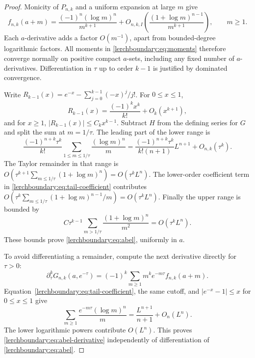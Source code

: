 \documentclass[11pt,a4paper]{article}
\theoremstyle{definition}
\theoremstyle{remark}
\numberwithin{equation}{section}
\begin{document}
\begin{proof}
Monicity of $P_{n,k}$ and a uniform expansion at large $m$ give
\begin{equation}\label{lerchboundary:eq:tail-coefficient}
 f_{n,k}(a+m)
 =\frac{(-1)^n(\log m)^n}{m^{k+1}}
 +O_{n,k,I}\left(\frac{(1+\log m)^{n-1}}{m^{k+1}}\right),
 \qquad m\geq1.
\end{equation}
Each $a$-derivative adds a factor $O(m^{-1})$, apart from bounded-degree
logarithmic factors.  All moments in \eqref{lerchboundary:eq:moments}
therefore converge normally on positive compact $a$-sets, including
any fixed number of $a$-derivatives. Differentiation in $\tau$ up to
order $k-1$ is justified by dominated convergence.

Write
$R_{k-1}(x)=e^{-x}-\sum_{j=0}^{k-1}(-x)^j/j!$. For $0\leq x\leq1$,
\[
 R_{k-1}(x)=\frac{(-1)^k x^k}{k!}+O_k(x^{k+1}),
\]
and for $x\geq1$, $|R_{k-1}(x)|\leq C_k x^{k-1}$.
Subtract $H$ from the defining series for $G$ and split the sum at
$m=1/\tau$. The leading part of the lower range is
\[
 \frac{(-1)^{n+k}\tau^k}{k!}
 \sum_{1\leq m\leq1/\tau}\frac{(\log m)^n}{m}
 =\frac{(-1)^{n+k}\tau^k}{k!(n+1)}L^{n+1}+O_{n,k}(\tau^k).
\]
The Taylor remainder in that range is
$O(\tau^{k+1}\sum_{m\leq1/\tau}(1+\log m)^n)
=O(\tau^k L^n)$.  The lower-order coefficient term in
\eqref{lerchboundary:eq:tail-coefficient} contributes
$O(\tau^k\sum_{m\leq1/\tau}(1+\log m)^{n-1}/m)
=O(\tau^kL^n)$. Finally the upper range is bounded by
\[
 C\tau^{k-1}\sum_{m>1/\tau}\frac{(1+\log m)^n}{m^2}
 =O(\tau^kL^n).
\]
These bounds prove \eqref{lerchboundary:eq:abel}, uniformly in $a$.

To avoid differentiating a remainder, compute the next derivative
directly for $\tau>0$:
\[
 \partial_\tau^kG_{n,k}(a,e^{-\tau})
 =(-1)^k\sum_{m\geq1}m^k e^{-m\tau}f_{n,k}(a+m).
\]
Equation~\eqref{lerchboundary:eq:tail-coefficient}, the same cutoff,
and $|e^{-x}-1|\leq x$ for $0\leq x\leq1$ give
\[
 \sum_{m\geq1}\frac{e^{-m\tau}(\log m)^n}{m}
 =\frac{L^{n+1}}{n+1}+O_n(L^n).
\]
The lower logarithmic powers contribute $O(L^n)$.
This proves \eqref{lerchboundary:eq:abel-derivative} independently
of differentiation of \eqref{lerchboundary:eq:abel}.
\end{proof}
\end{document}
